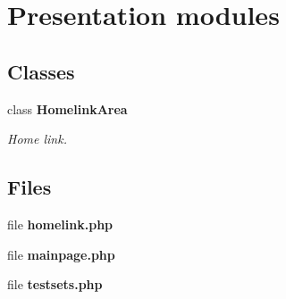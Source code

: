 \section{Presentation modules}
\label{group__OTK__UI__LAYER}
\subsection*{Classes}
\begin{DoxyCompactItemize}
\item 
class {\bf HomelinkArea}
\begin{DoxyCompactList}\small\item\em Home link. \end{DoxyCompactList}\end{DoxyCompactItemize}
\subsection*{Files}
\begin{DoxyCompactItemize}
\item 
file {\bf homelink.php}
\item 
file {\bf mainpage.php}
\item 
file {\bf testsets.php}
\end{DoxyCompactItemize}
